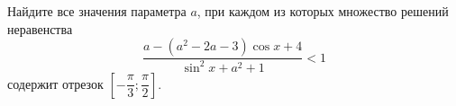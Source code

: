 \begin{ex}
	\begin{condition}
		Найдите все значения параметра \( a \), при каждом из которых множество решений неравенства \[ \dfrac{a-(a^2-2a-3)\cos x + 4}{\sin^2x+a^2+1}<1 \] содержит отрезок \( \left[ -\dfrac{\pi}{3};\dfrac{\pi}{2} \right] \).
	\end{condition}
\end{ex}